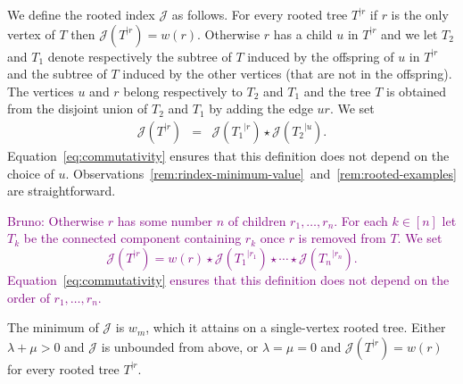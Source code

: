 \documentclass[11 pt]{modarticle}
\newcommand{\cR}{\mathbb{R}}
\newcommand{\wmap}{w}
\newcommand{\wmin}{w_m}
\newcommand{\rtree}[2]{{#1}^{\lvert #2}}
\newcommand{\ourproduct}{b}
\newcommand{\rindexsymbol}{\mathcal{J}}
\newcommand{\rindex}[2]{\rindexsymbol(\rtree{#2}{#1})}
\newcommand{\bldcomment}[1]{\textcolor{purple}{{\footnotesize Bruno:} #1}}
\begin{document}
We define the rooted index $\rindexsymbol$ as follows. For every rooted tree $\rtree{T}{r}$ if $r$ is the only vertex of $T$ then $\rindex{r}{T} = \wmap(r)$. Otherwise $r$ has a child $u$ in $\rtree{T}{r}$ and we let $T_2$ and $T_1$ denote respectively the subtree of $T$ induced by the offspring of $u$ in $\rtree{T}{r}$ and the subtree of $T$ induced by the other vertices (that are not in the offspring). The vertices $u$ and $r$ belong respectively to $T_2$ and $T_1$ and the tree $T$ is obtained from the disjoint union of $T_2$ and $T_1$ by adding the edge $ur$. We set
\begin{eqnarray}
	\rindex{r}{T} & = & \rindex{r}{T_1} \star \rindex{u}{T_2}. \label{eq:rindex-tree-decomp}
\end{eqnarray}
Equation~\eqref{eq:commutativity} ensures that this definition does not depend on the choice of $u$. Observations~\ref{rem:rindex-minimum-value}~and~\ref{rem:rooted-examples} are straightforward.

\bldcomment{
Otherwise $r$ has some number $n$ of children $r_1,\dots,r_n$. For each $k\in[n]$ let $T_k$ be the connected component containing $r_k$ once $r$ is removed from $T$. We set
\[
\rindex{r}{T}  =  \wmap(r) \star \rindex{r_1}{T_1} \star \cdots \star \rindex{r_n}{T_n}. \label{eq:rindex-tree-fulldecomp}
\]
Equation~\eqref{eq:commutativity} ensures that this definition does not depend on the order of $r_1,\dots, r_n$.
}

\begin{rem}\label{rem:rindex-minimum-value}
The minimum of $\rindexsymbol$ is $\wmin$, which it attains on a single-vertex rooted tree. Either $\lambda + \mu > 0$ and $\rindexsymbol$ is unbounded from above, or $\lambda = \mu = 0$ and $\rindex{r}{T} = \wmap(r)$ for every rooted tree $\rtree{T}{r}$.
\end{rem}
\end{document}
